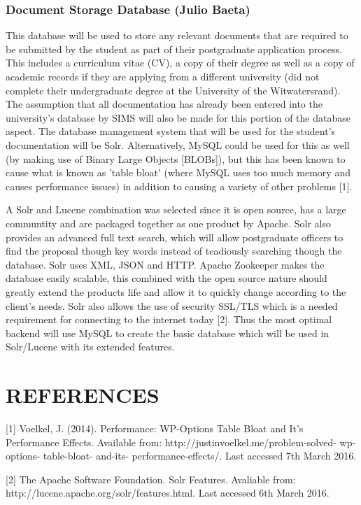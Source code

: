 \documentclass[journal,comsoc]{IEEEtran}
\begin{document}
\subsubsection{Document Storage Database (Julio Baeta)}

This database will be used to store any relevant documents that are required to be submitted by the student as part of their postgraduate application process. This includes a curriculum vitae (CV), a copy of their degree as well as a copy of academic records if they are applying from a different university (did not complete their undergraduate degree at the University of the Witwatersrand). The assumption that all documentation has already been entered into the university's database by SIMS will also be made for this portion of the database aspect. The database management system that will be used for the student's documentation will be Solr. Alternatively, MySQL could be used for this as well (by making use of Binary Large Objects [BLOBs]), but this has been known to cause what is known as 'table bloat' (where MySQL uses too much memory and causes performance issues) in addition to causing a variety of other problems [1].

\break A Solr and Lucene combination was selected since it is open source, has a large communtity and are packaged together as one product by Apache. Solr also provides an advanced full text search, which will allow postgraduate officers to find the proposal though key words instead of teadiously searching though the database. Solr uses XML, JSON and HTTP. Apache Zookeeper makes the database easily scalable, this combined with the open source nature should greatly extend the products life and allow it to quickly change according to the client's needs. Solr also allows the use of security SSL/TLS which is a needed requirement for connecting to the internet today [2]. Thus the most optimal backend will use MySQL to create the basic database which will be used in Solr/Lucene with its extended features.
\hfill \break




\section{REFERENCES}

[1] Voelkel, J. (2014). Performance: WP-Options Table Bloat and It’s Performance Effects. Available from: http://justinvoelkel.me/problem-solved- wp-options- table-bloat- and-its- performance-effects/. Last accessed 7th March 2016. \hfill \break

[2] The Apache Software Foundation. Solr Features. Avaliable from: http://lucene.apache.org/solr/features.html. Last accessed 6th March 2016. \hfill \break

\end{document}

